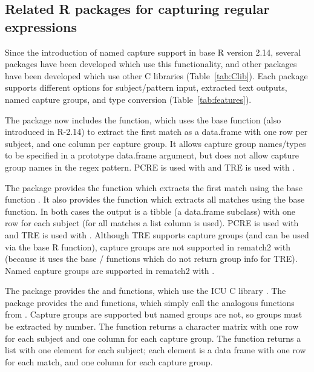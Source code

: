 \subsection{Related R packages for capturing regular expressions}

Since the introduction of named capture support in base R version
2.14, several packages have been developed which use this
functionality, and other packages have been developed which use other
C libraries (Table~\ref{tab:Clib}). Each package supports different
options for subject/pattern input, extracted text outputs, named
capture groups, and type conversion (Table~\ref{tab:features}). 

The  package now includes the  function, which uses the
base  function (also introduced in R-2.14) to extract the first
match as a data.frame with one row per subject, and one column per
capture group. It allows capture group names/types to be specified in
a prototype data.frame argument, but does not allow capture group
names in the regex pattern. PCRE is used with 
and TRE is used with .
 
The  package provides the  function which
extracts the first match using the base  function
\citep{rematch2}. It also provides the  function
which extracts all matches using the base  function. In
both cases the output is a tibble (a data.frame subclass) with one row
for each subject (for all matches a list column is used). PCRE is used
with  and TRE is used with . Although
TRE supports capture groups (and can be used via the base R 
function), capture groups are not supported in rematch2 with
 (because it uses the base / functions
which do not return group info for TRE). Named capture groups are
supported in rematch2 with .

The  package provides the  and
 functions, which use the ICU C library
\citep{stringi}. The  package provides the  and
 functions, which simply call the analogous
functions from . Capture groups are supported but named groups
are not, so groups must be extracted by number. The 
function returns a character matrix with one row for each subject and
one column for each capture group. The  function
returns a list with one element for each subject; each element is a
data frame with one row for each match, and one column for each
capture group.

